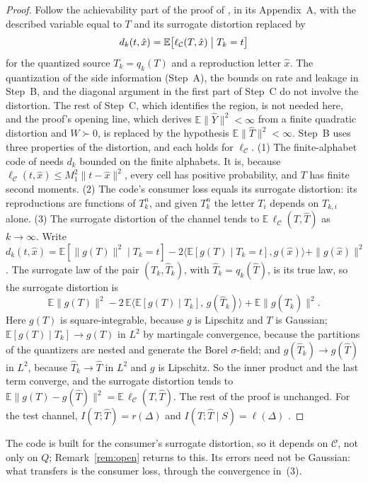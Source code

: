 \documentclass[11pt,onecolumn]{IEEEtran}
\newcommand{\E}{\mathbb{E}}
\begin{document}
\begin{proof}
Follow the achievability part of the proof of \cite[Theorem~3]{part1}, in its
Appendix~A, with the described variable equal to $T$ and its surrogate distortion
replaced by
\[
d_k(t,\hat x)=\E\bigl[\ell_{\mathcal C}(T,\hat x)\bigm|T_k=t\bigr]
\]
for the quantized source $T_k=q_k(T)$ and a reproduction letter $\hat x$. The
quantization of the side information (Step~A), the bounds on rate and leakage in
Step~B, and the diagonal argument in the first part of Step~C do not involve the
distortion. The rest of Step~C, which identifies the region, is not needed here, and the
proof's opening line, which derives $\E\|\hat Y\|^2<\infty$ from a finite quadratic
distortion and $W\succ0$, is replaced by the hypothesis $\E\|\hat T\|^2<\infty$. Step~B
uses three properties of the distortion, and each holds for $\ell_{\mathcal C}$.
(1) The finite-alphabet code of \cite[Lemma~A]{part1} needs $d_k$ bounded on the finite
alphabets. It is, because $\ell_{\mathcal C}(t,\hat x)\le M_1^2\|t-\hat x\|^2$, every cell
has positive probability, and $T$ has finite second moments.
(2) The code's consumer loss equals its surrogate distortion: its reproductions are
functions of $T_k^n$, and given $T_k^n$ the letter $T_i$ depends on $T_{k,i}$ alone.
(3) The surrogate distortion of the channel tends to $\E\,\ell_{\mathcal C}(T,\hat T)$ as
$k\to\infty$. Write
$d_k(t,\hat x)=\E[\|g(T)\|^2\mid T_k=t]-2\langle\E[g(T)\mid T_k=t],g(\hat x)\rangle+\|g(\hat x)\|^2$.
The surrogate law of the pair $(T_k,\hat T_k)$, with $\hat T_k=q_k(\hat T)$, is its true
law, so the surrogate distortion is
\[
\E\|g(T)\|^2-2\,\E\bigl\langle\E[g(T)\mid T_k],\,g(\hat T_k)\bigr\rangle+\E\|g(\hat T_k)\|^2 .
\]
Here $g(T)$ is square-integrable, because $g$ is Lipschitz and $T$ is Gaussian;
$\E[g(T)\mid T_k]\to g(T)$ in $L^2$ by martingale convergence, because the partitions
of the quantizers are nested and generate the Borel $\sigma$-field; and
$g(\hat T_k)\to g(\hat T)$ in $L^2$, because $\hat T_k\to\hat T$ in $L^2$
\cite[proof of Theorem~3]{part1} and $g$ is Lipschitz. So the inner product and the last
term converge, and the surrogate distortion tends to
$\E\|g(T)-g(\hat T)\|^2=\E\,\ell_{\mathcal C}(T,\hat T)$. The rest of the proof is unchanged.
For the test channel, $I(T;\hat T)=r(\Delta)$ and $I(T;\hat T\mid S)=\ell(\Delta)$
\cite[Proposition~2]{part1}.
\end{proof}

The code is built for the consumer's surrogate distortion, so it depends on
$\mathcal C$, not only on $Q$; Remark~\ref{rem:open} returns to this. Its errors need not
be Gaussian: what transfers is the consumer loss, through the convergence in~(3).
\end{document}
